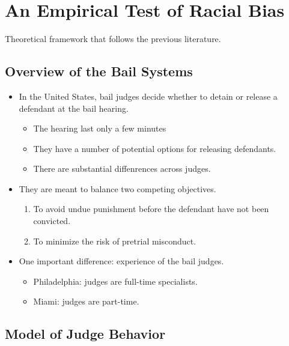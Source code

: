 \documentclass[../root]{subfiles}
\begin{document}
    \section{An Empirical Test of Racial Bias}

    Theoretical framework that follows the previous literature.

    \subsection{Overview of the Bail Systems}

    \begin{itemize}
      \item In the United States, bail judges decide whether to detain or release a defendant at the bail hearing.
      \begin{itemize}
        \item The hearing last only a few minutes
        \item They have a number of potential options for releasing defendants.
        \item There are substantial diffenrences across judges.
      \end{itemize}
      \item They are meant to balance two competing objectives.
      \begin{enumerate}
        \item To avoid undue punishment before the defendant have not been convicted.
        \item To minimize the risk of pretrial misconduct.
      \end{enumerate}
      \item One important difference: experience of the bail judges.
      \begin{itemize}
        \item Philadelphia: judges are full-time specialists.
        \item Miami: judges are part-time.
      \end{itemize}
    \end{itemize}

    \subsection{Model of Judge Behavior}
\end{document}
